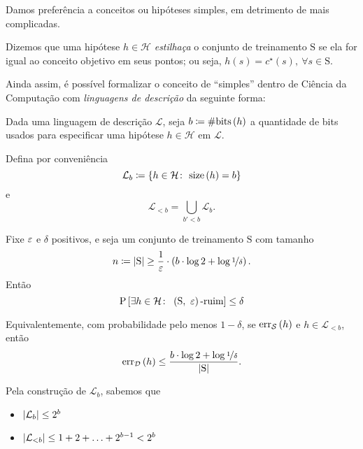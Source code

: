 \begin{afirmacao}
  \label{afr:navalha_de_occam}
  Damos preferência a conceitos ou hipóteses simples, em detrimento de mais complicadas.
\end{afirmacao}

\begin{definicao}[Estilhaçamento]
  \label{def:estilhacamento}
  Dizemos que uma hipótese $h\in\mathcal{H}$ \textit{estilhaça} o conjunto de treinamento $\mathrm{S}$ se ela for igual ao conceito objetivo em seus pontos; ou seja, $h\left(s\right)=c^\star\left(s\right),\ \forall s\in\mathrm{S}$.
\end{definicao}

Ainda assim, é possível formalizar o conceito de ``simples'' dentro de Ciência da Computação com \textit{linguagens de descrição} da seguinte forma:
\begin{teorema}
  \label{teo:navalha_de_occam}
  Dada uma linguagem de descrição $\mathcal{L}$, seja $b\coloneqq\#\mathrm{bits}\left(h\vphantom{1j}\right)$ a quantidade de bits usados para especificar uma hipótese $h\in\mathcal{H}$ em $\mathcal{L}$.

  Defina por conveniência
  \[
    \mathcal{L}_b\coloneqq\left\{h\in\mathcal{H}\colon\ \mathrm{size}\left(h\vphantom{1j}\right)=b\vphantom{1j}\right\}
  \]
  e
  \[ 
    \mathcal{L}_{<b} = \bigcup_{b'<b} \mathcal{L}_b.
  \]

  Fixe $\varepsilon$ e $\delta$ positivos, e seja um conjunto de treinamento $\mathrm{S}$ com tamanho
  \[
    n \coloneqq \left|\mathrm{S}\vphantom{1j}\right| \geq \frac{1}{\varepsilon}\cdot\left(b\cdot\log2 + \log\nicefrac{1}{\delta}\vphantom{1j}\right).
  \]
  Então
  \[
    \mathrm{P}\left[\exists h\in\mathcal{H}\colon\ \left(\mathrm{S},\ \eps\vphantom{1j}\right)\text{-ruim}\vphantom{1j}\right] \leq \delta
  \]

  Equivalentemente, com probabilidade pelo menos $1-\delta$, se $\mathrm{err}_\mathcal{S}\left(h\vphantom{1j}\right)$ e $h\in\mathcal{L}_{<b}$, então
  \[
    \mathrm{err}_\mathcal{D}\left(h\vphantom{1j}\right) \leq \frac{b\cdot\log2 + \log\nicefrac{1}{\delta}}{\left|\mathrm{S}\vphantom{1j}\right|}.
  \]
\end{teorema}

\begin{observacao}
  Pela construção de $\mathcal{L}_b$, sabemos que
  \begin{itemize}
    \item $\left|\mathcal{L}_b\vphantom{1j}\right| \leq 2^b$
    \item $\left|\mathcal{L}_{<b}\vphantom{1j}\right| \leq 1 + 2 + \ldots + 2^{b-1} < 2^b$
  \end{itemize}
\end{observacao}

